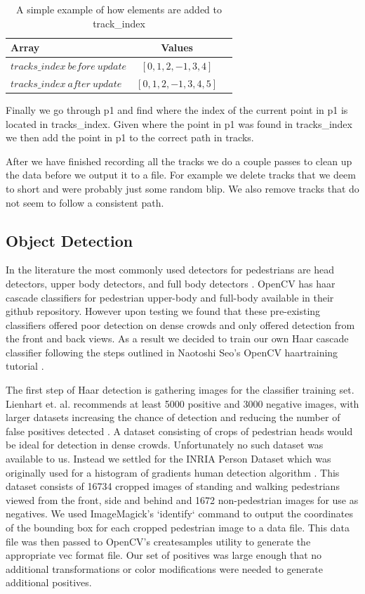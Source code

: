 \documentclass[12pt, onecolumn, conference]{IEEEtran}
\begin{document}
\begin{table}[!t]
\caption{A simple example of how elements are added to track\_index}
\label{table_index_add}
\centering
\begin{tabular}{ | l | c | r | }
 \hline
 Array & Values\\
  \hline           
  $tracks\_index\ before\ update$ & $[0, 1, 2, -1, 3, 4]$ \\
  $tracks\_index\ after\ update$ & $[0, 1, 2, -1, 3, 4, 5]$ \\
  \hline  
\end{tabular}
\end{table}

Finally we go through p1 and find where the index of the current point in p1 is located in tracks\_index. Given where the point in p1 was found in tracks\_index we then add the point in p1 to the correct path in tracks.

After we have finished recording all the tracks we do a couple passes to clean up the data before we output it to a file. For example we delete tracks that we deem to short and were probably just some random blip. We also remove tracks that do not seem to follow a consistent path.

\subsection{Object Detection}

In the literature the most commonly used detectors for pedestrians are head detectors, upper body detectors, and full body detectors \cite{G. Shu}\cite{P. Viola}. OpenCV has haar cascade classifiers for pedestrian upper-body and full-body available in their github repository\cite{Itseez}. However upon testing we found that these pre-existing classifiers offered poor detection on dense crowds and only offered detection from the front and back views. As a result we decided to train our own Haar cascade classifier following the steps outlined in Naotoshi Seo’s OpenCV haartraining tutorial \cite{N. Seo}. 

The first step of Haar detection is gathering images for the classifier training set. Lienhart et. al. recommends at least 5000 positive and 3000 negative images, with larger datasets increasing the chance of detection and reducing the number of false positives detected \cite{R. Lienhart 1}. A dataset consisting of crops of pedestrian heads would be ideal for detection in dense crowds. Unfortunately no such dataset was available to us. Instead we settled for the INRIA Person Dataset which was originally used for a histogram of gradients human detection algorithm \cite{INRIA}\cite{N. Dalal}. This dataset consists of  16734 cropped images of standing and walking pedestrians viewed from the front, side and behind and 1672 non-pedestrian images for use as negatives. We used ImageMagick’s `identify` command to output the coordinates of the bounding box for each cropped pedestrian image to a data file. This data file was then passed to OpenCV’s createsamples utility to generate the appropriate vec format file. Our set of positives was large enough that no additional transformations or color modifications were needed to generate additional positives. 
\end{document}
